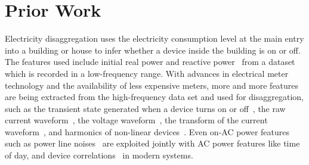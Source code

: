 \section{Prior Work}
Electricity disaggregation uses the electricity consumption level at the main entry into a building or house 
to infer whether a device inside the building is on or off. 
The features used include initial real power and reactive power~\cite{hart1992} from a dataset which is recorded in 
a low-frequency range. 
With advances in electrical meter technology and the availability of less expensive meters, 
more and more features are being extracted from the high-frequency data set and used for disaggregation, such as 
the transient state generated when a device turns on or off~\cite{shaw2000PhdThesis},
the raw current waveform~\cite{srinivasan2006neural}, the voltage waveform~\cite{lam2007novel}, 
the transform of the current waveform~\cite{chan2000harmonics}, 
and harmonics of non-linear devices~\cite{chan2000harmonics}. 
Even on-AC power features such as power line noises~\cite{patel2007flick}
are exploited jointly with AC power features like  
time of day, and device correlations~\cite{kim2011unsupervised}
in modern systems.

